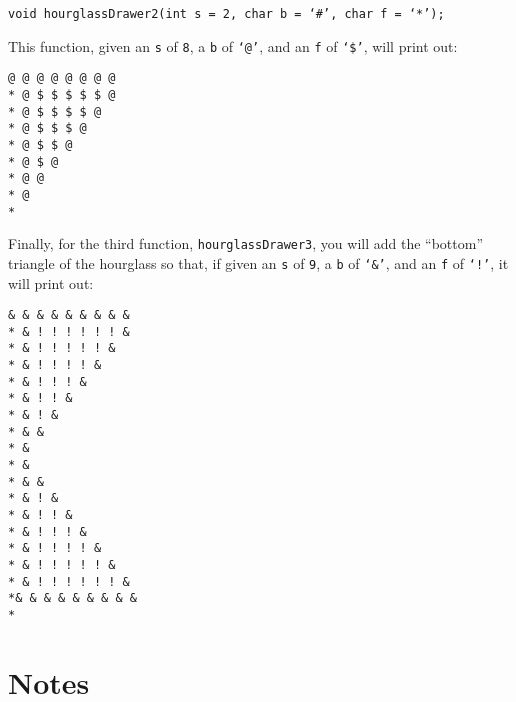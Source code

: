 \documentclass[11 pt]{article}
\begin{document}
\begin{center}
    \texttt{void hourglassDrawer2(int s = 2, char b =  `\#', char f = `*');}
\end{center}

This function, given an \texttt{s} of \texttt{8}, a \texttt{b} of \texttt{`@'}, and an \texttt{f} of \texttt{`\$'}, will print out:

\begin{center}
    \texttt{@ @ @ @ @ @ @ @ \\* @ \$ \$ \$ \$ \$ @ \\*  @ \$ \$ \$ \$ @ \\*   @ \$ \$ \$ @ \\*    @ \$ \$ @ \\*     @ \$ @ \\*      @ @ \\*       @ \\*}
\end{center}

\noindent Finally, for the third function, \texttt{hourglassDrawer3}, you will add the ``bottom'' triangle of the hourglass so that, if given an \texttt{s} of \texttt{9}, a \texttt{b} of \texttt{`\&'}, and an \texttt{f} of \texttt{`!'}, it will print out:

\begin{center}
    \texttt{\& \& \& \& \& \& \& \& \& \\* \& !\ !\ !\ !\ !\ !\ \& \\*  \& !\ !\ !\ !\ !\ \& \\*   \& !\ !\ !\ !\ \& \\*    \& !\ !\ !\ \& \\*     \& !\ !\ \& \\*      \& !\ \& \\*       \& \& \\*        \& \\*        \& \\*       \& \& \\*      \& !\ \& \\*     \& !\ !\ \& \\*    \& !\ !\ !\ \& \\*   \& !\ !\ !\ !\ \& \\*  \& !\ !\ !\ !\ !\ \& \\* \& !\ !\ !\ !\ !\ !\ \& \\*\& \& \& \& \& \& \& \& \& \\*}
\end{center}

\section{Notes}
\end{document}
